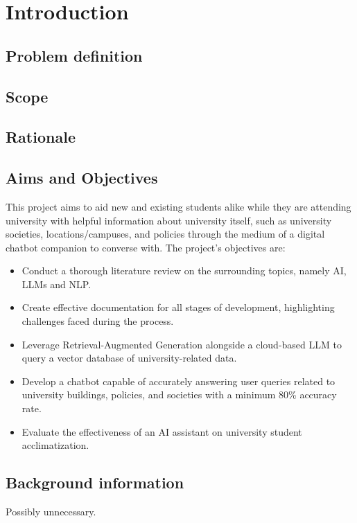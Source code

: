 \chapter{Introduction}


\section{Problem definition}


\section{Scope}


\section{Rationale}


\section{Aims and Objectives}\label{sec:AimsAndObjectives}
This project aims to aid new and existing students alike while they are attending university with 
helpful information about university itself, such as university societies, locations/campuses, 
and policies through the medium of a digital chatbot companion to converse with.
The project's objectives are:

\begin{itemize}
    \item Conduct a thorough literature review on the surrounding topics, namely AI, LLMs and NLP.
    \item Create effective documentation for all stages of development, highlighting challenges faced during the process.
    \item Leverage Retrieval-Augmented Generation alongside a cloud-based LLM to query a vector database of university-related data.
    \item Develop a chatbot capable of accurately answering user queries related to university 
    buildings, policies, and societies with a minimum 80\% accuracy rate.
    \item Evaluate the effectiveness of an AI assistant on university student acclimatization.
\end{itemize}

\section{Background information}
Possibly unnecessary.
